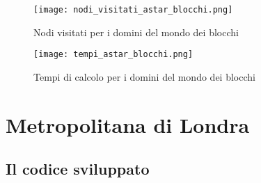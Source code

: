 \begin{figure}[htp]
  \texttt{[image: nodi\_visitati\_astar\_blocchi.png]}
  \caption{Nodi visitati per i domini del mondo dei blocchi}
  \label{fig:figure15}
\end{figure}

\begin{figure}[htp]
  \texttt{[image: tempi\_astar\_blocchi.png]}
  \caption{Tempi di calcolo per i domini del mondo dei blocchi}
  \label{fig:figure16}
\end{figure}

\chapter{Metropolitana di Londra}

\section{Il codice sviluppato}

